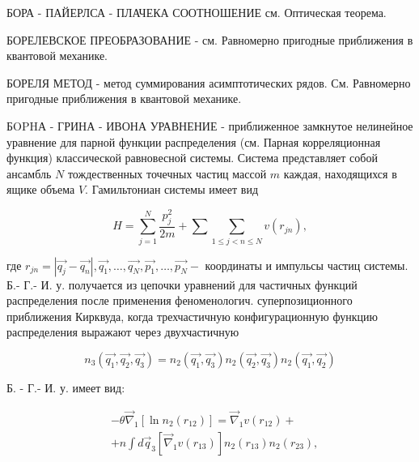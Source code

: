 \documentclass[10pt]{article}
\begin{document}
БОРА - ПАЙЕРЛСА - ПЛАЧЕКА СООТНОШЕНИЕ см. Оптическая теорема.



БОРЕЛЕВСКОЕ ПРЕОБРАЗОВАНИЕ - см. Равномерно пригодные приближения в квантовой механике.



БОРЕЛЯ МЕТОД - метод суммирования асимптотических рядов. См. Равномерно пригодные приближения в квантовой механике.



БOPHА - ГРИНА - ИВОНА УРАВНЕНИЕ - приближенное замкнутое нелинейное уравнение для парной функции распределения (см. Парная корреляционная функция) классической равновесной системы. Система представляет собой ансамбль $N$ тождественных точечных частиц массой $m$ каждая, находящихся в ящике объема $V$. Гамильтониан системы имеет вид



\[

H=\sum_{j=1}^{N} \frac{p_{j}^{2}}{2 m}+\sum \sum_{1 \leqslant j<n \leqslant N} v\left(r_{j n}\right),

\]



где $r_{j n}=\left|\overrightarrow{q_{j}}-\overrightarrow{q_{n}}\right|, \overrightarrow{q_{1}}, \ldots, \overrightarrow{q_{N}}, \overrightarrow{p_{1}}, \ldots, \overrightarrow{p_{N}}-$ координаты и импульсы частиц системы. Б.- Г.- И. у. получается из цепочки уравнений для частичных функций распределения после применения феноменологич. суперпозиционного приближения Кирквуда, когда трехчастичную конфигурационную функцию распределения выражают через двухчастичную



\[

n_{3}\left(\overrightarrow{q_{1}}, \overrightarrow{q_{2}}, \overrightarrow{q_{3}}\right)=n_{2}\left(\overrightarrow{q_{1}}, \overrightarrow{q_{3}}\right) n_{2}\left(\overrightarrow{q_{2}}, \overrightarrow{q_{3}}\right) n_{2}\left(\overrightarrow{q_{1}}, \overrightarrow{q_{2}}\right)

\]



Б. - Г.- И. у. имеет вид:



\[

\begin{aligned}

& -\theta \vec{\nabla}_{1}\left[\ln n_{2}\left(r_{12}\right)\right]=\vec{\nabla}_{1} v\left(r_{12}\right)+ \\

& +n \int d \vec{q}_{3}\left[\vec{\nabla}_{1} v\left(r_{13}\right)\right] n_{2}\left(r_{13}\right) n_{2}\left(r_{23}\right),

\end{aligned}

\]
\end{document}
